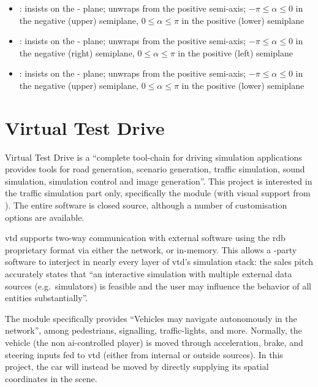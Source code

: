 \begin{itemize}
	\item {}: insists on the - plane; unwraps from the positive  semi-axis; $-\pi \leqslant \alpha \leqslant 0$ in the negative (upper) semiplane, $0 \leqslant \alpha \leqslant \pi$ in the positive (lower) semiplane
	\item {}: insists on the - plane; unwraps from the positive  semi-axis; $-\pi \leqslant \alpha \leqslant 0$ in the negative (right) semiplane, $0 \leqslant \alpha \leqslant \pi$ in the positive (left) semiplane
	\item {}: insists on the - plane; unwraps from the positive  semi-axis; $-\pi \leqslant \alpha \leqslant 0$ in the negative (upper) semiplane, $0 \leqslant \alpha \leqslant \pi$ in the positive (lower) semiplane
\end{itemize}

\section{Virtual Test Drive}\label{sc:software:vtd}

Virtual Test Drive is a \enquote{complete tool-chain for driving simulation applications \FONTnormal{[that]} provides tools for road generation, scenario generation, traffic simulation, sound simulation, simulation control and image generation}{\cite{software:vtd}}. This project is interested in the traffic simulation part only, specifically the  module (with visual support from ). The entire software is closed source, although a number of customisation options are available.

\gls{vtd} supports two-way communication with external software using the \gls{rdb} proprietary format via either the network, or in-memory. This allows a -party software to interject in nearly every layer of \gls{vtd}'s simulation stack: the sales pitch accurately states that \enquote{an interactive simulation with multiple external data sources (e.g.\ simulators) is feasible and the user may influence the behavior of all entities substantially}{\cite{software:vtraffic}}.

The  module specifically provides \enquote{Vehicles \FONTnormal{[that]} may navigate autonomously in the \CHARomissis{} network}{\cite{software:vtraffic}}, among pedestrians, signalling, traffic-lights, and more. Normally, the  vehicle (the non \gls{ai}-controlled player) is moved through acceleration, brake, and steering inputs fed to \gls{vtd} (either from internal or outside sources). In this project, the  car will instead be moved by directly supplying its spatial coordinates in the scene.

